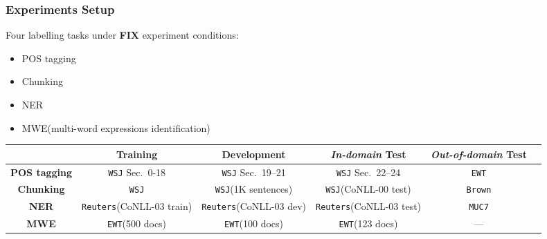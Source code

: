 \documentclass{beamer}
\newcommand{\dataset}[1]{\texttt{#1}\xspace}
\newcommand{\EWT}{\dataset{EWT}}
\newcommand{\WSJ}{\dataset{WSJ}}
\newcommand{\Brown}{\dataset{Brown}}
\newcommand{\Reuters}{\dataset{Reuters}}
\newcommand{\MUC}{\dataset{MUC7}}
\newcommand{\task}[1]{\textsf{#1}\xspace}
\newcommand{\pos}{\task{POS tagging}}
\newcommand{\chunking}{\task{Chunking}}
\newcommand{\ner}{\task{NER}}
\newcommand{\mwe}{\task{MWE}}
\begin{document}
\begin{frame}
\frametitle{\textbf{Experiments Setup}} 

Four labelling tasks under \textbf{FIX} experiment conditions:

\begin{itemize}
\item[\ding{51}] \pos 
\item[\ding{51}] \chunking
\item[\ding{51}] \ner 
\item[\ding{51}] \mwe (multi-word expressions identification)
\end{itemize}  

\begin{table}
\begin{tiny}
\begin{tabular}{@{}c@{~~}c@{~~}c@{~~}c@{~~}c@{~~}c@{}}
\hline
& \textbf{Training} & \textbf{Development} & \textbf{\textit{In-domain} Test} & \textbf{\textit{Out-of-domain} Test} \\ \hline
\textbf{\pos} & \WSJ Sec.\ 0-18  & \WSJ Sec.\ 19--21 & \WSJ Sec.\ 22--24 & \EWT  \\
\textbf{\chunking} & \WSJ & \WSJ (1K sentences) & \WSJ (CoNLL-00 test) & \Brown \\
\textbf{\ner} & \Reuters (CoNLL-03 train) & \Reuters (CoNLL-03 dev) & \Reuters (CoNLL-03 test) & \MUC  \\
\textbf{\mwe} & \EWT (500 docs) & \EWT (100 docs)  & \EWT (123 docs) & --- \\
\hline
\end{tabular}
\label{}
\end{tiny}
\end{table}

\end{frame}
\end{document}
